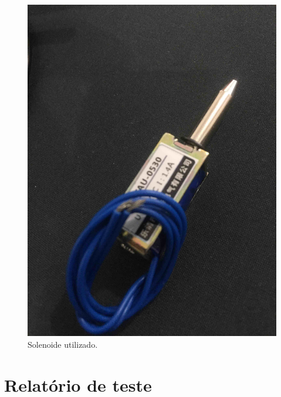 \begin{figure}[!h]
            \centering
         	\includegraphics[scale= 0.06]{figuras/solenoide.jpg}
            \caption{Solenoide utilizado.}
            \label{solenoide}
\end{figure}

	
\section{Relatório de teste}



